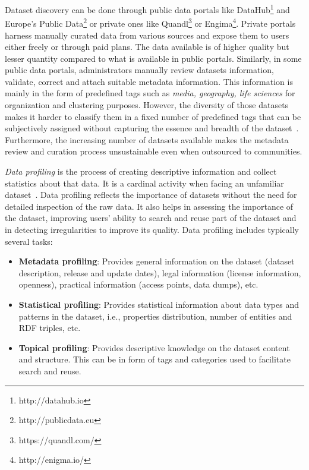 \documentclass[runningheads,a4paper]{llncs}
\begin{document}
Dataset discovery can be done through public data portals like DataHub\footnote{http://datahub.io} and Europe's Public Data\footnote{http://publicdata.eu} or private ones like Quandl\footnote{https://quandl.com/} or Engima\footnote{http://enigma.io/}. Private portals harness manually curated data from various sources and expose them to users either freely or through paid plans. The data available is of higher quality but lesser quantity compared to what is available in public portals. Similarly, in some public data portals, administrators manually review datasets information, validate, correct and attach suitable metadata information. This information is mainly in the form of predefined tags such as \textit{media, geography, life sciences} for organization and clustering purposes. However, the diversity of those datasets makes it harder to classify them in a fixed number of predefined tags that can be subjectively assigned without capturing the essence and breadth of the dataset~\cite{6690016}. Furthermore, the increasing number of datasets available makes the metadata review and curation process unsustainable even when outsourced to communities.

\textit{Data profiling} is the process of creating descriptive information and collect statistics about that data. It is a cardinal activity when facing an unfamiliar dataset~\cite{semwebprofiling}. Data profiling reflects the importance of datasets without the need for detailed inspection of the raw data.  It also helps in assessing the importance of the dataset, improving users' ability to search and reuse part of the dataset and in detecting irregularities to improve its quality. Data profiling includes typically several tasks:
\begin{itemize}
  \item \textbf{Metadata profiling}: Provides general information on the dataset (dataset description, release and update dates), legal information (license information, openness), practical information (access points, data dumps), etc.
  \item \textbf{Statistical profiling}: Provides statistical information about data types and patterns in the dataset, i.e., properties distribution, number of entities and RDF triples, etc.
  \item \textbf{Topical profiling}: Provides descriptive knowledge on the dataset content and structure. This can be in form of tags and categories used to facilitate search and reuse.
\end{itemize}
\end{document}
